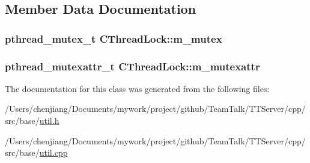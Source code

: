 \subsection{Member Data Documentation}
\hypertarget{class_c_thread_lock_a1232fdc54be5b4863269354a7f23225d}{}
\subsubsection[{m\+\_\+mutex}]{\setlength{\rightskip}{0pt plus 5cm}pthread\+\_\+mutex\+\_\+t C\+Thread\+Lock\+::m\+\_\+mutex\hspace{0.3cm}{\ttfamily [private]}}\label{class_c_thread_lock_a1232fdc54be5b4863269354a7f23225d}
\hypertarget{class_c_thread_lock_acea8910c9a7484b088fbe22c33ed4ec1}{}
\subsubsection[{m\+\_\+mutexattr}]{\setlength{\rightskip}{0pt plus 5cm}pthread\+\_\+mutexattr\+\_\+t C\+Thread\+Lock\+::m\+\_\+mutexattr\hspace{0.3cm}{\ttfamily [private]}}\label{class_c_thread_lock_acea8910c9a7484b088fbe22c33ed4ec1}


The documentation for this class was generated from the following files\+:\begin{DoxyCompactItemize}
\item 
/\+Users/chenjiang/\+Documents/mywork/project/github/\+Team\+Talk/\+T\+T\+Server/cpp/src/base/\hyperlink{base_2util_8h}{util.\+h}\item 
/\+Users/chenjiang/\+Documents/mywork/project/github/\+Team\+Talk/\+T\+T\+Server/cpp/src/base/\hyperlink{base_2util_8cpp}{util.\+cpp}\end{DoxyCompactItemize}
